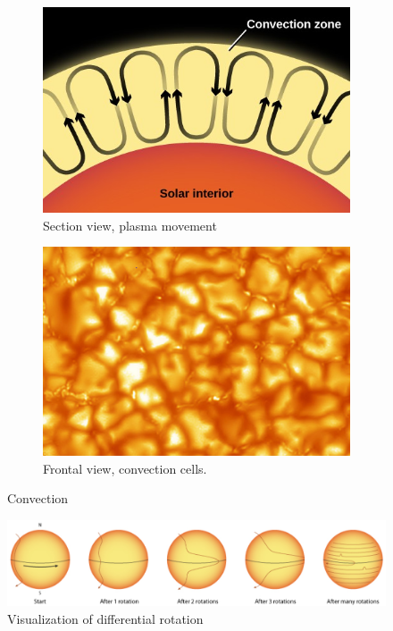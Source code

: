\begin{figure}[t]
    \centering
    \begin{subfigure}[b]{0.49\textwidth}
        \includegraphics[width=\textwidth]{./pictures/convection}
        \caption{Section view, plasma movement}
        \label{fig:convect}
    \end{subfigure}
    \begin{subfigure}[b]{0.49\textwidth}
        \includegraphics[width=\textwidth]{./pictures/convection-cell}
        \caption{Frontal view, convection cells.}
        \label{fig:convect-cells}
    \end{subfigure}
    \caption{Convection}\label{fig:systemview}
\end{figure}
\begin{figure}[t]
    \centering
    \includegraphics[width=\textwidth]{./pictures/diffrot}
    \caption{Visualization of differential rotation}
    \label{fig:diffrot}
\end{figure}
